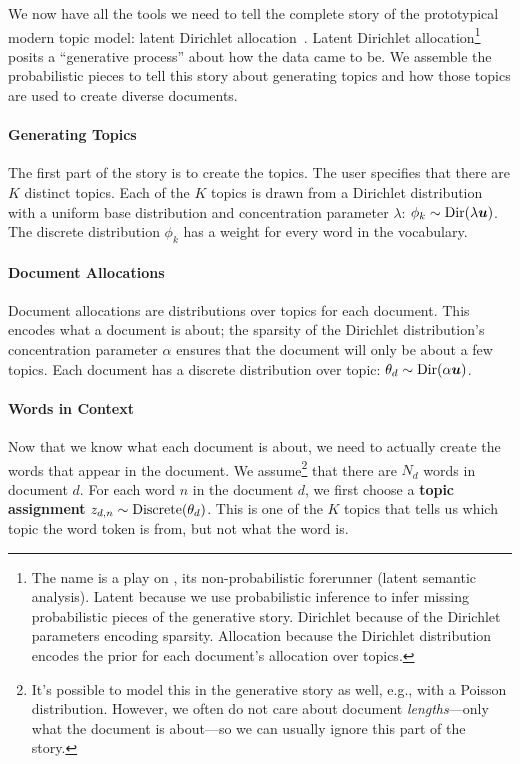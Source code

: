 We now have all the tools we need to tell the complete story of the prototypical
modern topic model: latent Dirichlet allocation~\citep{blei-03}.  Latent
Dirichlet allocation\footnote{The name  is a play on , its
  non-probabilistic forerunner (latent semantic analysis).  Latent because we
  use probabilistic inference to infer missing probabilistic pieces of the
  generative story.  Dirichlet because of the Dirichlet parameters encoding
  sparsity.  Allocation because the Dirichlet distribution encodes the prior for
  each document's allocation over topics.} posits a ``generative process'' about
how the data came to be.  We assemble the probabilistic pieces to tell
this story about generating topics and how those topics are used to create
diverse documents.


\paragraph{Generating Topics}

The first part of the story is to create the topics.  The user specifies that
there are $K$ distinct topics.  Each of the $K$ topics is drawn from a Dirichlet
distribution with a uniform base distribution and concentration parameter
$\lambda$: $\phi_k \sim \mbox{Dir}(\lambda {\bm u})$.  The discrete distribution
$\phi_k$ has a weight for every word in the vocabulary.

\paragraph{Document Allocations}

Document allocations are distributions over topics for each document.  This
encodes what a document is about; the sparsity of the Dirichlet distribution's
concentration parameter $\alpha$ ensures that the document will only be about a
few topics.  Each document has a discrete distribution over topic: $\theta_d \sim
\mbox{Dir}(\alpha {\bm u})$.

\paragraph{Words in Context}

Now that we know what each document is about, we need to actually create the
words that appear in the document.  We assume\footnote{It's possible to model
  this in the generative story as well, e.g., with a Poisson distribution.
  However, we often do not care about document \emph{lengths}---only what the
  document is about---so we can usually ignore this part of the story.} that
there are $N_d$ words in document $d$.  For each word $n$ in the
document $d$, we first choose a {\bf topic assignment} $z_{d,n} \sim
\mbox{Discrete}( \theta_d)$.  This is one of the $K$ topics that tells us which topic the
word token is from, but not what the word is.

